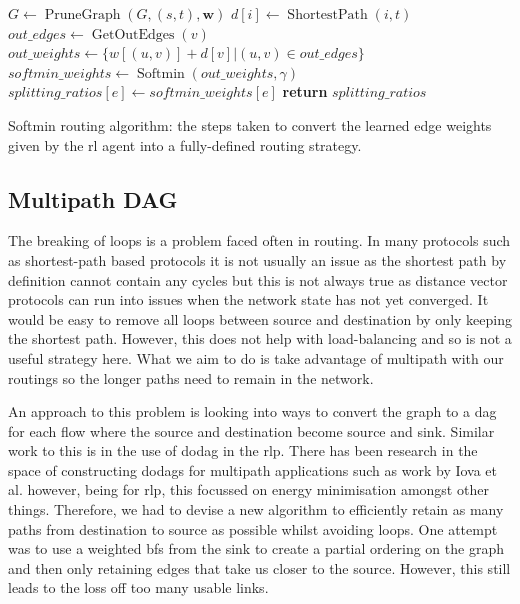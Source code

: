 \begin{algorithm}[t]
\small
\begin{algorithmic}
    \State $G \gets \operatorname{PruneGraph}(G, (s, t), \bm{w})$
      \State $d[i] \gets \operatorname{ShortestPath}(i, t)$
    \EndFor
      \State $out\_edges \gets \operatorname{GetOutEdges}(v)$
      \State $out\_weights \gets \{w[(u, v)] + d[v] | (u, v) \in out\_edges\}$
      \State{}
      \State $softmin\_weights \gets \operatorname{Softmin}(out\_weights, \gamma)$
        \State $splitting\_ratios[e] \gets softmin\_weights[e]$
      \EndFor
    \EndFor
  \EndFor
  \State \textbf{return} $splitting\_ratios$
\EndFunction
\end{algorithmic}
\caption{Softmin routing algorithm: the steps taken to convert the learned edge weights given by the \ac{rl} agent into a fully-defined routing strategy.}
\label{algorithm:softmin}
\end{algorithm}

\subsection{Multipath DAG}
The breaking of loops is a problem faced often in routing. In many protocols such as shortest-path based protocols it is not usually an issue as the shortest path by definition cannot contain any cycles but this is not always true as distance vector protocols can run into issues when the network state has not yet converged. It would be easy to remove all loops between source and destination by only keeping the shortest path. However, this does not help with load-balancing and so is not a useful strategy here. What we aim to do is take advantage of multipath with our routings so the longer paths need to remain in the network.

An approach to this problem is looking into ways to convert the graph to a \ac{dag} for each flow where the source and destination become source and sink. Similar work to this is in the use of \ac{dodag} in the \ac{rlp}\cite{rfc6550}. There has been research in the space of constructing \acp{dodag} for multipath applications such as work by Iova et al.\cite{iova2015using} however, being for \ac{rlp}, this focussed on energy minimisation amongst other things.
Therefore, we had to devise a new algorithm to efficiently retain as many paths from destination to source as possible whilst avoiding loops. One attempt was to use a weighted \ac{bfs} from the sink to create a partial ordering on the graph and then only retaining edges that take us closer to the source. However, this still leads to the loss off too many usable links.

